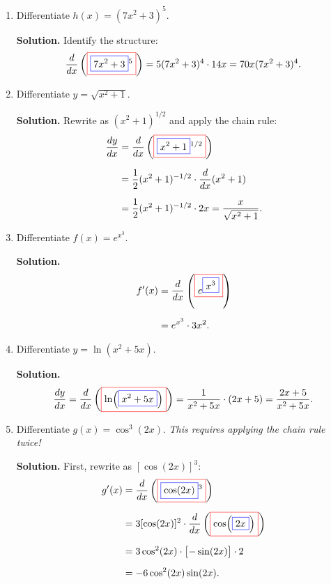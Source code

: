\documentclass[11pt]{article}
\newcommand{\outside}[1]{\fcolorbox{red}{white}{#1}}
\newcommand{\inside}[1]{\fcolorbox{blue}{white}{#1}}
\begin{document}
\begin{enumerate}
\item Differentiate $h(x) = (7x^2 + 3)^5$.

\textbf{Solution.} Identify the structure:
\[
  \frac{d}{dx}\left(\outside{$\displaystyle \inside{$\displaystyle 7x^2 + 3$}^{5}$}\right)
  = 5(7x^2 + 3)^4 \cdot 14x
  = 70x(7x^2 + 3)^4.
\]

\item Differentiate $y = \sqrt{x^2 + 1}$.

\textbf{Solution.} Rewrite as $(x^2 + 1)^{1/2}$ and apply the chain rule:
\begin{align*}
  \frac{dy}{dx}
    &= \frac{d}{dx}\left(\outside{$\displaystyle
         \inside{$\displaystyle x^2 + 1$}^{1/2}$}\right) \\[6pt]
    &= \frac{1}{2}(x^2 + 1)^{-1/2} \cdot \frac{d}{dx}(x^2 + 1) \\[6pt]
    &= \frac{1}{2}(x^2 + 1)^{-1/2} \cdot 2x
     = \frac{x}{\sqrt{x^2 + 1}}.
\end{align*}

\item Differentiate $f(x) = e^{x^3}$.

\textbf{Solution.}
\begin{align*}
  f'(x)
    &= \frac{d}{dx}\left(\outside{$\displaystyle
         e^{\inside{$\displaystyle x^3$}}$}\right) \\[6pt]
    &= e^{x^3} \cdot 3x^2.
\end{align*}

\item Differentiate $y = \ln(x^2 + 5x)$.

\textbf{Solution.}
\[
  \frac{dy}{dx}
    = \frac{d}{dx}\left(\outside{$\displaystyle
       \ln\!\left(\inside{$\displaystyle x^2 + 5x$}\right)$}\right)
    = \frac{1}{x^2 + 5x} \cdot (2x + 5)
    = \frac{2x + 5}{x^2 + 5x}.
\]

\item Differentiate $g(x) = \cos^3(2x)$. \emph{This requires applying the chain rule twice!}

\textbf{Solution.} First, rewrite as $[\cos(2x)]^3$:
\begin{align*}
  g'(x) &= \frac{d}{dx}\left(
    \outside{$\displaystyle
      \inside{$\displaystyle \cos(2x)$}^{3}
    $}\right) \\[6pt]
  &= 3[\cos(2x)]^2 \cdot \frac{d}{dx}\left(
    \outside{$\displaystyle
      \cos\!\left(\inside{$\displaystyle 2x$}\right)
    $}\right) \\[6pt]
  &= 3\cos^2(2x) \cdot \bigl[-\sin(2x)\bigr] \cdot 2 \\[6pt]
  &= -6 \cos^2(2x) \sin(2x).
\end{align*}
\end{enumerate}
\end{document}
